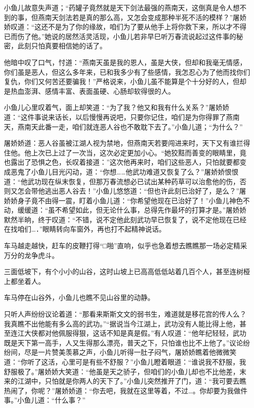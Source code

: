 \documentclass[12pt,oneside]{book}
\begin{document}
小鱼儿故意失声道；``药罐子竟然就是天下剑法最强的燕南天，这倒真是令人想不到的事，但燕南天剑法若是真的那么高，又怎会变成那种半死不活的模样？''屠娇娇叹道：``这还不是为了你的缘故，咱们为了要从他手上将你救下来，所以才不得已而伤了他。''她说的居然活灵活现，小鱼儿若非早巳听万春流说起过这件事的秘密，此刻只怕真要相信她的话了。

他暗中叹了口气，忖道：``燕南天虽是我的恩人，虽是大侠，但却和我毫无情感，你们虽是恶人，但这么多年来，已和我多少有了些感情，我怎忍心为了他而找你们复仇，你们又何苦还要骗我！''严格说来，小鱼儿虽不能算是个十分好的人，但却是热血澎湃、感情丰富、表面虽硬、心肠却软得很的人。

小鱼儿心里叹着气，面上却笑道：``为了我？他又和我有什么关系？''屠娇娇道：``这件事说来话长，以后慢慢再说吧，只要你记住，咱们是为你得罪了燕南天，燕南天此番一走，咱们就连恶人谷也不敢耽下去了。''小鱼儿道；``为什么？''

屠娇娇道：恶人谷虽被江湖人视为禁地，但燕南天若要闯进来时，天下又有谁拦得住他。他上次已上过了一次当，这次必定更加小心。``她狡黠而善变的眼睛里，竟也露出了恐惧之色，长叹着接道：''这次他再来时，咱们这些恶人，只怕就要都变成恶鬼了小鱼儿目光闪动，道：``你想\ldots\ldots 他武功难道又恢复了么？''屠娇娇恨恨道：``他武功现在纵末恢复，但那万春流想必已试出某种药草可以治愈他的伤，否则又怎会带他逃出恶人谷去！''小鱼儿悠悠道：``但也许此刻已治好了，是么？''屠娇娇身子竟不由得一震，盯着小鱼儿道：``你希望他现在已治好了！''小鱼儿神色不动，缓缓道：``虽不希望如此，但无论什么事，总得先作最坏的打算才是。''屠娇娇默然半晌，终于叹道：``不错，说不定他此刻武功早已恢复了，说不定他现在已经在找咱们\ldots．''眼睛转向车窗外，再也打不起精神说话。

车马越走越快，赶车的皮鞭打得``□啪''直响，似乎也急着想去瞧瞧那一场必定精采万分的龙争虎斗。

三面低坡下，有个小小的山谷，这时山坡上已高高低低站着几百个人，甚至连树桠上都坐着人。

车马停在山谷外，小鱼儿也瞧不见山谷里的动静。

只听人声纷纷议论着道：``那看来斯斯文文的弱书生，难道就是移花宫的传人么？我真瞧不出他能有多么高的武功。''``据说当今江湖上，武功没有人能比得上他，甚至连江大侠都对他佩服得狠，这话不知是真是假。''有人叹道：``他年纪轻轻，武功既是天下第一高手，人又生得那么漂亮，普天之下，只怕谁也比不上他了。''议论纷纷间，尽是一片赞美羡慕之声，小鱼儿听得一肚子闷气，屠娇娇瞧着他微微笑道：``你听了这活，心里可是有些不舒服？''小鱼儿瞪着眼道：``谁说我不舒服，我舒服极了。''屠娇娇大笑道：``他虽是天之骄子，但咱们的小鱼儿却也不比他差，末来的江湖中，只怕就是你两人的天下了。''小鱼儿突然推开了门，道：``我可要去瞧热闹了，你呢？''屠娇娇道：``你去吧，我就在这里等着，不过\ldots。你却要为我做件事。''小鱼儿道：``什么事？''
\end{document}
